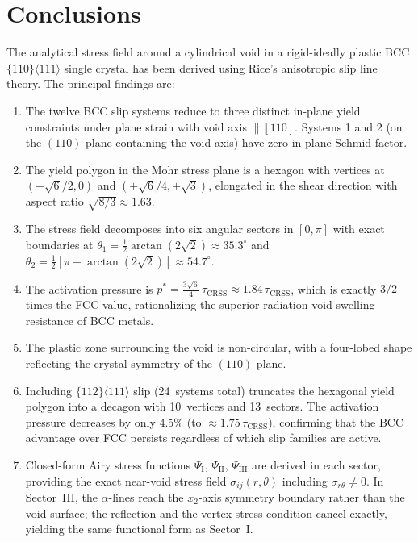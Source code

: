 \documentclass{svjour3} %
\newcommand{\tcrss}{\tau_{\mathrm{CRSS}}}
\newcommand{\srt}{\sigma_{r\theta}}
\begin{document}
\section{Conclusions}
\label{sec:conclusions}

The analytical stress field around a cylindrical void in a rigid-ideally
plastic BCC $\{110\}\langle 111\rangle$ single crystal has been derived
using Rice's anisotropic slip line theory. The principal findings are:

\begin{enumerate}
\item The twelve BCC slip systems reduce to three distinct in-plane yield
constraints under plane strain with void axis $\|[110]$. Systems 1 and 2
(on the $(110)$ plane containing the void axis) have zero in-plane Schmid
factor.

\item The yield polygon in the Mohr stress plane is a hexagon with vertices
at $(\pm\sqrt{6}/2, 0)$ and $(\pm\sqrt{6}/4, \pm\sqrt{3})$, elongated
in the shear direction with aspect ratio $\sqrt{8/3} \approx 1.63$.

\item The stress field decomposes into six angular sectors in $[0, \pi]$
with exact boundaries at $\theta_1 = \frac{1}{2}\arctan(2\sqrt{2})
\approx 35.3^\circ$ and $\theta_2 = \frac{1}{2}[\pi - \arctan(2\sqrt{2})]
\approx 54.7^\circ$.

\item The activation pressure is
$p^* = \frac{3\sqrt{6}}{4}\,\tcrss \approx 1.84\,\tcrss$, which is
exactly $3/2$ times the FCC value, rationalizing the superior radiation
void swelling resistance of BCC metals.

\item The plastic zone surrounding the void is non-circular, with a
four-lobed shape reflecting the crystal symmetry of the $(110)$ plane.

\item Including $\{112\}\langle 111\rangle$ slip (24~systems total)
truncates the hexagonal yield polygon into a decagon with 10~vertices
and 13~sectors. The activation pressure decreases by only 4.5\%
(to $\approx 1.75\,\tcrss$), confirming that the BCC advantage over
FCC persists regardless of which slip families are active.

\item Closed-form Airy stress functions $\Psi_{\mathrm{I}}$,
$\Psi_{\mathrm{II}}$, $\Psi_{\mathrm{III}}$ are derived in each
sector, providing the exact near-void stress field
$\sigma_{ij}(r, \theta)$ including $\srt \neq 0$. In Sector~III, the
$\alpha$-lines reach the $x_2$-axis symmetry boundary rather than the
void surface; the reflection and the vertex stress condition cancel
exactly, yielding the same functional form as Sector~I.


\end{enumerate}
\end{document}
